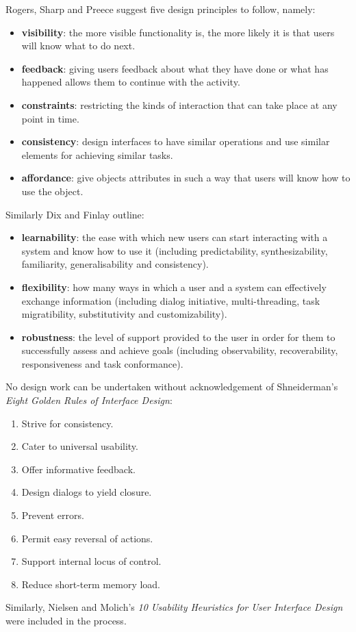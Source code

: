 Rogers, Sharp and Preece\citep[p. 26-29]{RogersPreece} suggest five design principles to follow, namely:
\begin{itemize}
 \item  \textbf{visibility}: the more visible functionality is, the more likely it is that users will know what to do next.
\item \textbf{feedback}: giving users feedback about what they have done or what has happened allows them to continue with the activity.
\item \textbf{constraints}: restricting the kinds of interaction that can take place at any point in time.
\item \textbf{consistency}: design interfaces to have similar operations and use similar elements for achieving similar tasks.
\item \textbf{affordance}: give objects attributes in such a way that users will know how to use the object.
\end{itemize}
Similarly Dix and Finlay\citep[p. 260]{DixFinlay} outline: 
\begin{itemize}
 \item \textbf{learnability}: the ease with which new users can start interacting with a system and know how to use it (including predictability, synthesizability, familiarity, generalisability and consistency). 
 \item  \textbf{flexibility}: how many ways in which a user and a system can effectively exchange information (including dialog initiative, multi-threading, task migratibility, substitutivity and customizability).
 \item  \textbf{robustness}: the level of support provided to the user in order for them to successfully assess and achieve goals (including observability, recoverability, responsiveness and task conformance). 
\end{itemize}

No design work can be undertaken without acknowledgement of Shneiderman's \textit{Eight Golden Rules of Interface Design}\citep{ShneidermanPlaisant}:
\begin{enumerate}
 \item Strive for consistency.
 \item  Cater to universal usability.
 \item Offer informative feedback.
 \item Design dialogs to yield closure.
 \item Prevent errors.
 \item Permit easy reversal of actions.
 \item Support internal locus of control.
 \item Reduce short-term memory load.
\end{enumerate}
Similarly, Nielsen and Molich's \textit{10 Usability Heuristics for User Interface Design}\citep[p. 249]{NielsenHeuristics} were included in the process.

